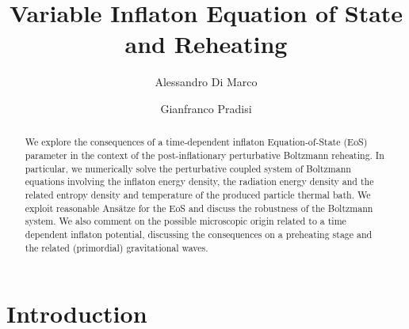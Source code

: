 \documentclass[%
aps,prd,nofootinbib,showkeys,a4paper,10pt
]{revtex4-2}
\begin{document}
\title{Variable Inflaton Equation of State and Reheating}


\author{Alessandro Di Marco}

\author{Gianfranco Pradisi}






\begin{abstract}

We explore the consequences of a time-dependent inflaton Equation-of-State (EoS) parameter in the context of the post-inflationary perturbative Boltzmann reheating.
In particular, we numerically solve the perturbative coupled system of Boltzmann equations involving
the inflaton energy density, the radiation energy density and the related entropy density and temperature of the produced particle thermal bath.
We exploit reasonable Ans\"atze for the EoS and discuss the robustness of the Boltzmann system.
We also comment on the possible microscopic origin related to a 
time dependent inflaton potential, discussing the consequences on a 
preheating stage and the related (primordial) gravitational waves.

\end{abstract}



   

                              

\maketitle

\tableofcontents



\section{Introduction}	
\end{document}
